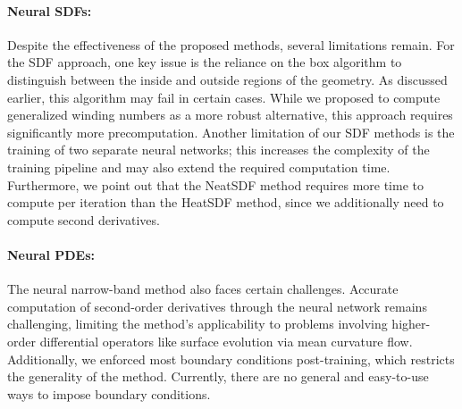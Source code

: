 \documentclass[12pt,openany]{book}
\theoremstyle{plainnormal}
\theoremstyle{remark}
\begin{document}
\paragraph{Neural SDFs:} Despite the effectiveness of the proposed methods, several limitations remain. For the SDF approach, one key issue is the reliance on the box algorithm to distinguish between the inside and outside regions of the geometry. As discussed earlier, this algorithm may fail in certain cases. While we proposed to compute generalized winding numbers as a more robust alternative, this approach requires significantly more precomputation. Another limitation of our SDF methods is the training of two separate neural networks; this increases the complexity of the training pipeline and may also extend the required computation time. Furthermore, we point out that the NeatSDF method requires more time to compute per iteration than the HeatSDF method, since we additionally need to compute second derivatives.
\paragraph{Neural PDEs:} The neural narrow-band method also faces certain challenges. Accurate computation of second-order derivatives through the neural network remains challenging, limiting the method's applicability to problems involving higher-order differential operators like surface evolution via mean curvature flow. Additionally, we enforced most boundary conditions post-training, which restricts the generality of the method. Currently, there are no general and easy-to-use ways to impose boundary conditions. 
\end{document}
